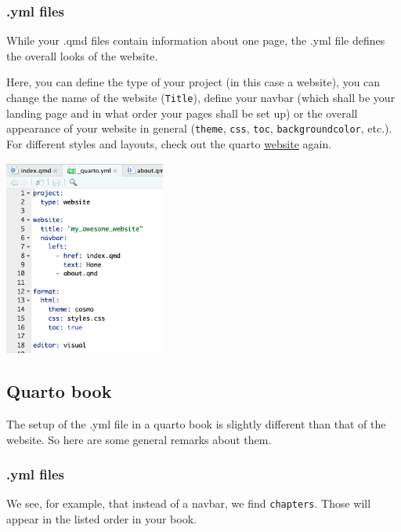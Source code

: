 \documentclass[
  letterpaper,
  DIV=11,
  numbers=noendperiod]{scrreprt}
\begin{document}
\hypertarget{yml-files}{%
\subsubsection{.yml files}\label{yml-files}}

While your .qmd files contain information about one page, the .yml file
defines the overall looks of the website.

Here, you can define the type of your project (in this case a website),
you can change the name of the website (\texttt{Title}), define your
navbar (which shall be your landing page and in what order your pages
shall be set up) or the overall appearance of your website in general
(\texttt{theme}, \texttt{css}, \texttt{toc}, \texttt{backgroundcolor},
etc.). For different styles and layouts, check out the quarto
\href{https://quarto.org/docs/reference/formats/html.html}{website}
again.

\includegraphics[width=2.08333in,height=\textheight]{img/quarto_intro/Screenshot 2023-10-12 at 11.25.37.png}

\hypertarget{quarto-book}{%
\subsection{Quarto book}\label{quarto-book}}

The setup of the .yml file in a quarto book is slightly different than
that of the website. So here are some general remarks about them.

\hypertarget{yml-files-1}{%
\subsubsection{.yml files}\label{yml-files-1}}

We see, for example, that instead of a navbar, we find
\texttt{chapters}. Those will appear in the listed order in your book.
\end{document}
